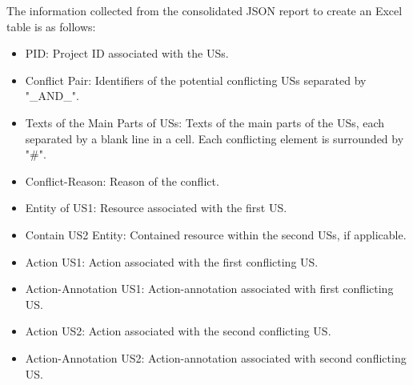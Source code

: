 The information collected from the consolidated JSON report to create an Excel table is as follows:
\begin{itemize}
	\item PID: Project ID associated with the USs.
	
	\item Conflict Pair: Identifiers of the potential conflicting USs separated by "\_AND\_".
	
	\item Texts of the Main Parts of USs: Texts of the main parts of the USs, each separated by a blank line in a cell. Each conflicting element is surrounded by "\#".
	
	\item Conflict-Reason: Reason of the conflict.
	
	\item Entity of US1: Resource associated with the first US.
	
	\item Contain US2 Entity: Contained resource within the second USs, if applicable.
	
	\item Action US1: Action associated with the first conflicting US.
	
	\item Action-Annotation US1: Action-annotation associated with first conflicting US.
	
	\item Action US2: Action associated with the second conflicting US.
	
	\item Action-Annotation US2: Action-annotation associated with second conflicting US.
	
\end{itemize}
